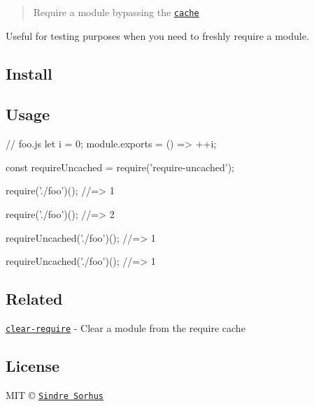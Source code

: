 \begin{quote}
Require a module bypassing the \href{https://nodejs.org/api/modules.html#modules_caching}{\tt cache} \end{quote}


Useful for testing purposes when you need to freshly require a module.

\subsection*{Install}




\subsection*{Usage}


\begin{DoxyCode}
// foo.js
let i = 0;
module.exports = () => ++i;
\end{DoxyCode}



\begin{DoxyCode}
const requireUncached = require('require-uncached');

require('./foo')();
//=> 1

require('./foo')();
//=> 2

requireUncached('./foo')();
//=> 1

requireUncached('./foo')();
//=> 1
\end{DoxyCode}


\subsection*{Related}


\begin{DoxyItemize}
\item \href{https://github.com/sindresorhus/clear-require}{\tt clear-\/require} -\/ Clear a module from the require cache
\end{DoxyItemize}

\subsection*{License}

M\+IT © \href{https://sindresorhus.com}{\tt Sindre Sorhus} 
